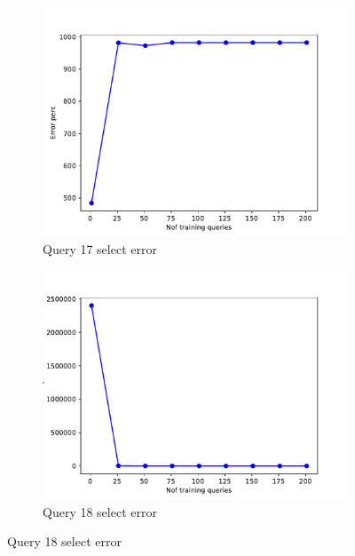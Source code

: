 \begin{figure}[!htb]
     \begin{subfigure}[t]{0.5\textwidth}
       \includegraphics[scale=0.4]{figs/tpch10/tpch10_sel17_error.pdf}
       \caption{Query 17 select error}
       \label{fig:tpch_sel17}
     \end{subfigure}
     \begin{subfigure}[t]{0.5\textwidth}
       \includegraphics[scale=0.4]{figs/tpch10/tpch10_sel18_error.pdf}
       \caption{Query 18 select error}
       \label{fig:tpch_sel18}
      \end{subfigure}
\end{figure}


